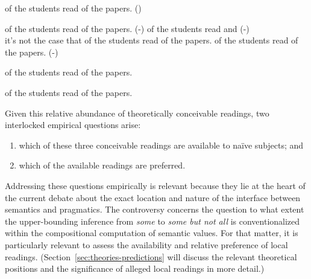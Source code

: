 \documentclass[fleqn,reqno,10pt,draft]{article}
\newcommand{\lit}{\acro{lit}}
\newcommand{\glb}{\acro{glb}}
\newcommand{\loc}{\acro{loc}}
\renewcommand{\es}{\acro{es}}
\begin{document}
\begin{exe}
\ex  \label{bsp:GE}  of the students read {} of the
  papers. \hfill{(\es)}

  \begin{xlist}
  \ex \label{bsp:GE-Literal}  of the students read
    {} of the papers. \hfill (\es-\lit)
  \ex \label{bsp:GE-Global}
     of the students read  
    and  \hfill (\es-\glb)\\
    it's not the case that  of the students read  of the papers.
  \ex \label{bsp:GE-Local}
     of the students read {} of the
    papers. \hfill (\es-\loc)
  \end{xlist}
\end{exe}


\begin{exe}
\ex \label{bsp:AE-Alternative}  of the students read
  {} of the papers. 

\ex \label{bsp:GE-Alternative}  of the students
  read {} of the papers.
\end{exe}


\noindent Given this relative abundance of theoretically conceivable
readings, two interlocked empirical questions arise:
\begin{enumerate}[Q1:]
\item which of these three
conceivable readings are available to na\"{i}ve subjects; and
\item which of the available readings are preferred.
\end{enumerate}
Addressing these questions empirically is relevant because they lie at
the heart of the current debate about the exact location and nature of
the interface between semantics and pragmatics. The controversy
concerns the question to what extent the upper-bounding inference from
\emph{some} to \emph{some but not all} is conventionalized within the
compositional computation of semantic values. For that matter, it is
particularly relevant to assess the availability and relative
preference of local readings. (Section~\ref{sec:theories-predictions}
will discuss the relevant theoretical positions and the significance
of alleged local readings in more detail.)
\end{document}
